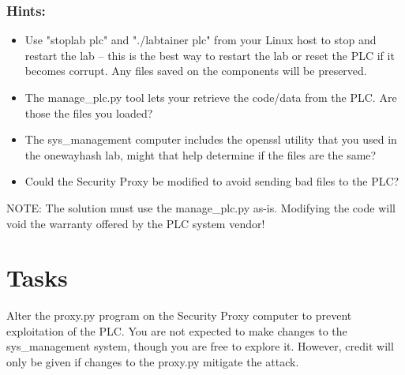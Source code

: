 \documentclass{article}
\begin{document}
\subsubsection{Hints:}
\begin{itemize}
\item Use "stoplab plc" and "./labtainer plc" from your Linux host to stop and restart the lab -- this is the
best way to restart the lab or reset the PLC if it becomes corrupt.  Any files saved on the components will be preserved.
\item The manage\_plc.py tool lets your retrieve the code/data from the PLC.  Are those the files you loaded?
\item The sys\_management computer includes the openssl utility that you used in the onewayhash lab, might that
help determine if the files are the same?
\item Could the Security Proxy be modified to avoid sending bad files to the PLC?
\end{itemize}
NOTE: The solution must use the manage\_plc.py as-is. Modifying the code will void the warranty offered by the PLC system vendor!

\section {Tasks}
Alter the proxy.py program on the Security Proxy computer to prevent exploitation of the PLC.
You are not expected to make changes to the sys\_management system, though you are free to explore it.
However, credit will only be given if changes to the proxy.py mitigate the attack.
\end{document}
